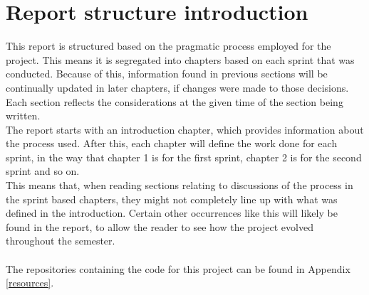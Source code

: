 \chapter*{Report structure introduction}
This report is structured based on the pragmatic process employed for the project.
This means it is segregated into chapters based on each sprint that was conducted.
Because of this, information found in previous sections will be continually updated in later chapters, if changes were made to those decisions.
Each section reflects the considerations at the given time of the section being written.\\
The report starts with an introduction chapter, which provides information about the process used.
After this, each chapter will define the work done for each sprint, in the way that chapter 1 is for the first sprint, chapter 2 is for the second sprint and so on.\\
This means that, when reading sections relating to discussions of the process in the sprint based chapters, they might not completely line up with what was defined in the introduction.
Certain other occurrences like this will likely be found in the report, to allow the reader to see how the project evolved throughout the semester.\\\\
The repositories containing the code for this project can be found in Appendix \autoref{resources}.